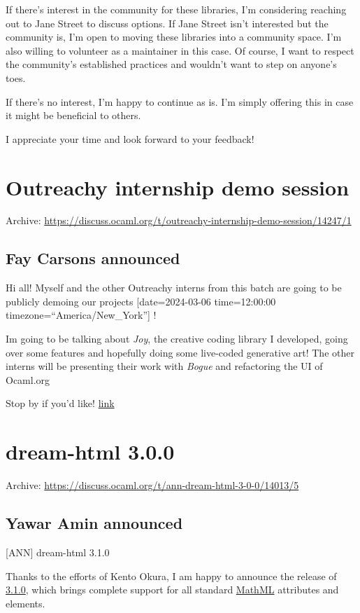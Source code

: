 \documentclass[11pt]{article}
\begin{document}
If there's interest in the community for these libraries, I'm considering reaching out to Jane Street to discuss
options. If Jane Street isn't interested but the community is, I'm open to moving these libraries into a community
space. I'm also willing to volunteer as a maintainer in this case. Of course, I want to respect the community's
established practices and wouldn't want to step on anyone's toes.

If there's no interest, I'm happy to continue as is. I'm simply offering this in case it might be beneficial to
others.

I appreciate your time and look forward to your feedback!
\section*{Outreachy internship demo session}
\label{13}
Archive: \url{https://discuss.ocaml.org/t/outreachy-internship-demo-session/14247/1}
\subsection*{Fay Carsons announced}
\label{sec:orgf570690}


Hi all! Myself and the other Outreachy interns from this batch are going to be publicly demoing our projects
{[}date=2024-03-06 time=12:00:00 timezone=``America/New\_York''] !

Im going to be talking about \emph{Joy}, the creative coding library I developed, going over some features and hopefully
doing some live-coded generative art! The other interns will be presenting their work with \emph{Bogue} and refactoring
the UI of Ocaml.org

Stop by if you'd like!
\href{https://meet.google.com/rym-eqax-uwb?hs=122\&authuser=0}{link}
\section*{dream-html 3.0.0}
\label{14}
Archive: \url{https://discuss.ocaml.org/t/ann-dream-html-3-0-0/14013/5}
\subsection*{Yawar Amin announced}
\label{sec:orgea17c5a}


{[}ANN] dream-html 3.1.0

Thanks to the efforts of Kento Okura, I am happy to announce the release of
\href{https://ocaml.org/p/dream-html/3.1.0}{3.1.0}, which brings complete support for all standard
\href{https://developer.mozilla.org/en-US/docs/Web/MathML}{MathML} attributes and elements.
\end{document}
